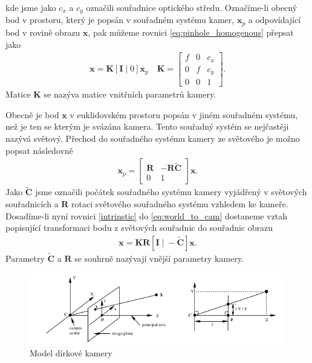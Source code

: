 \documentclass[twoside]{ctuthesis}
\newcommand{\tl}[1]{$\mathbf{#1}$}
\begin{document}
kde jsme jako $c_x$ a $c_y$ označili souřadnice optického středu. Označíme-li obecný bod v prostoru, který je popsán v souřadném systému kamer, \tl{x}$_p$ a odpovídající bod v rovině obrazu \tl{x}, pak můžeme rovnici \ref{eq:pinhole_homogenous} přepsat jako
\begin{align}
    \mathbf{x} = \mathbf{K}[\mathbf{I}\; |\; 0 ]\mathbf{x}_p \quad \mathbf{K} = \begin{bmatrix} f & 0 & c_x  \\ 0 & f & c_y  \\ 0 & 0 & 1  \end{bmatrix}.
    \label{intrinstic}
\end{align}
Matice \tl{K} se nazýva matice vnitřních parametrů kamery.

Obecně je bod $\mathbf{x}$ v euklidovském prostoru popsán v jiném souřadném systému, než je ten se kterým je svázána kamera. Tento souřadný systém se nejčastěji nazývá světový. Přechod do souřadného systému kamery ze světového je možno popsat následovně 
\begin{align} 
    \mathbf{x}_p = \begin{bmatrix} \mathbf{R} & -\mathbf{R\tilde C} \\ 0 & 1 \end{bmatrix}
    \mathbf{x}.
    \label{eq:world_to_cam}
\end{align}
Jako $\tilde{\mathbf{C}}$ jsme označili počátek souřadného systému kamery vyjádřený v světových souřadnicích a \tl{R} rotaci světového souřadného systému vzhledem ke kameře. Dosadíme-li nyní rovnici \ref{intrinstic} do \ref{eq:world_to_cam} dostaneme vztah popisující transformaci bodu z světových souřadnic do souřadnic obrazu
\begin{align}
    \mathbf{x} = \mathbf{KR}[\mathbf{I} \; | \; - \mathbf{\tilde C} ]\mathbf{x}.
    \label{eq:world_to_img}
\end{align}
Parametry $\mathbf{\tilde C}$ a \tl{R} se souhrně nazývají vnější parametry kamery. 
\begin{figure}
    \centering
    \includegraphics[width = 0.8\linewidth]{pictures/dirkovymodel_nakres.png}
    \caption{Model dírkové kamery}
    \label{pinhole}
\end{figure}
\end{document}
